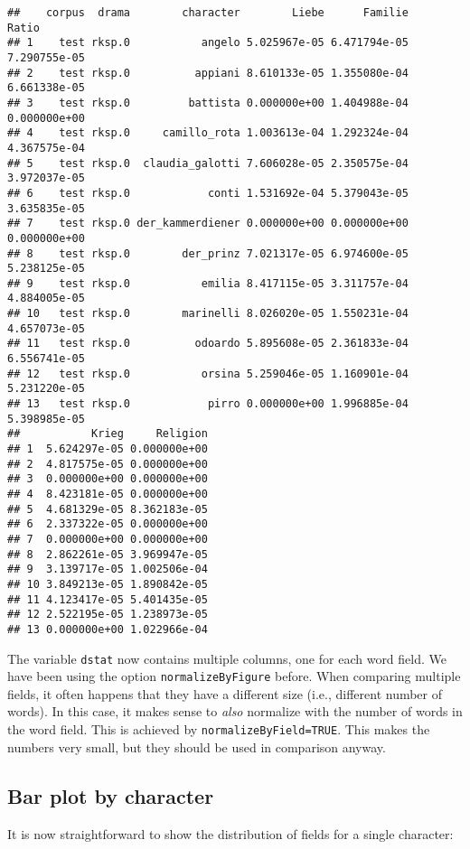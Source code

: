 \documentclass[]{book}
\begin{document}
\begin{verbatim}
##    corpus  drama        character        Liebe      Familie        Ratio
## 1    test rksp.0           angelo 5.025967e-05 6.471794e-05 7.290755e-05
## 2    test rksp.0          appiani 8.610133e-05 1.355080e-04 6.661338e-05
## 3    test rksp.0         battista 0.000000e+00 1.404988e-04 0.000000e+00
## 4    test rksp.0     camillo_rota 1.003613e-04 1.292324e-04 4.367575e-04
## 5    test rksp.0  claudia_galotti 7.606028e-05 2.350575e-04 3.972037e-05
## 6    test rksp.0            conti 1.531692e-04 5.379043e-05 3.635835e-05
## 7    test rksp.0 der_kammerdiener 0.000000e+00 0.000000e+00 0.000000e+00
## 8    test rksp.0        der_prinz 7.021317e-05 6.974600e-05 5.238125e-05
## 9    test rksp.0           emilia 8.417115e-05 3.311757e-04 4.884005e-05
## 10   test rksp.0        marinelli 8.026020e-05 1.550231e-04 4.657073e-05
## 11   test rksp.0          odoardo 5.895608e-05 2.361833e-04 6.556741e-05
## 12   test rksp.0           orsina 5.259046e-05 1.160901e-04 5.231220e-05
## 13   test rksp.0            pirro 0.000000e+00 1.996885e-04 5.398985e-05
##           Krieg     Religion
## 1  5.624297e-05 0.000000e+00
## 2  4.817575e-05 0.000000e+00
## 3  0.000000e+00 0.000000e+00
## 4  8.423181e-05 0.000000e+00
## 5  4.681329e-05 8.362183e-05
## 6  2.337322e-05 0.000000e+00
## 7  0.000000e+00 0.000000e+00
## 8  2.862261e-05 3.969947e-05
## 9  3.139717e-05 1.002506e-04
## 10 3.849213e-05 1.890842e-05
## 11 4.123417e-05 5.401435e-05
## 12 2.522195e-05 1.238973e-05
## 13 0.000000e+00 1.022966e-04
\end{verbatim}

The variable \texttt{dstat} now contains multiple columns, one for each word field. We have been using the option \texttt{normalizeByFigure} before. When comparing multiple fields, it often happens that they have a different size (i.e., different number of words). In this case, it makes sense to \emph{also} normalize with the number of words in the word field. This is achieved by \texttt{normalizeByField=TRUE}. This makes the numbers very small, but they should be used in comparison anyway.

\hypertarget{bar-plot-by-character}{%
\subsection{Bar plot by character}\label{bar-plot-by-character}}

It is now straightforward to show the distribution of fields for a single character:
\end{document}
